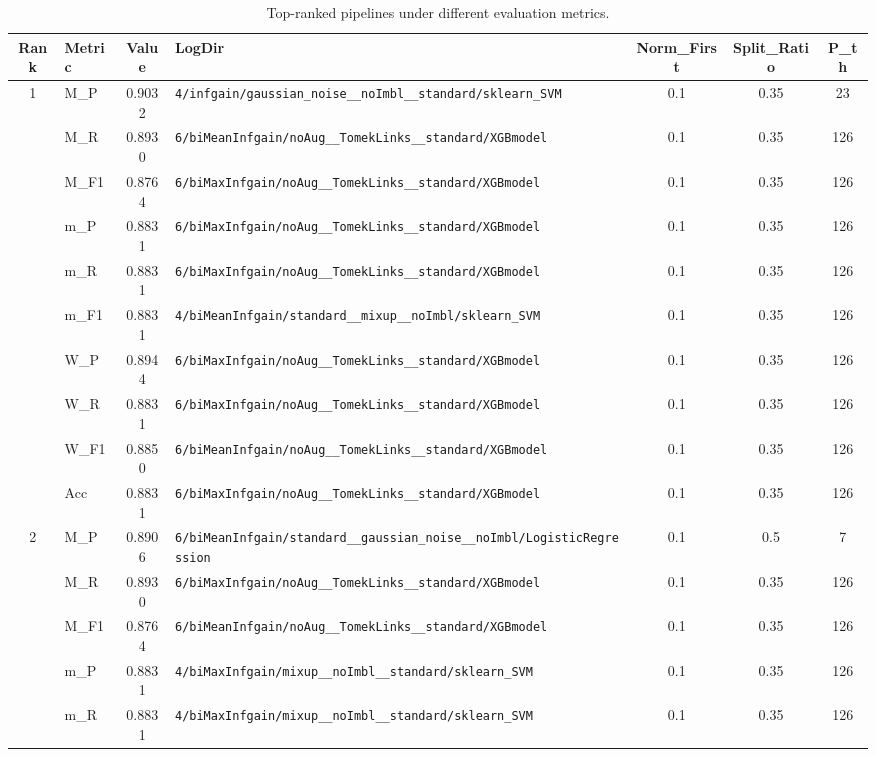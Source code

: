 \begin{table}[htbp]
\caption{Top-ranked pipelines under different evaluation metrics.}
\label{tab:rank_metric_vertical}
\centering
\small
\setlength{\tabcolsep}{4pt}
\begin{tabular}{|c|l|c|>{\ttfamily\footnotesize}p{7.2cm}|c|c|c|}
\hline
Rank & Metric & Value & LogDir & Norm\_First & Split\_Ratio & P\_th \\
\hline
\multirow{10}{*}{1} & M\_P & 0.9032 & \texttt{4/infgain/gaussian\_noise\_\_noImbl\_\_standard/sklearn\_SVM} & 0.1 & 0.35  & 23 \\ 
 & M\_R & 0.8930 & \texttt{6/biMeanInfgain/noAug\_\_TomekLinks\_\_standard/XGBmodel} & 0.1 & 0.35  & 126 \\ 
 & M\_F1 & 0.8764 & \texttt{6/biMaxInfgain/noAug\_\_TomekLinks\_\_standard/XGBmodel} & 0.1 & 0.35  & 126 \\ 
 & m\_P & 0.8831 & \texttt{6/biMaxInfgain/noAug\_\_TomekLinks\_\_standard/XGBmodel} & 0.1 & 0.35  & 126 \\ 
 & m\_R & 0.8831 & \texttt{6/biMaxInfgain/noAug\_\_TomekLinks\_\_standard/XGBmodel} & 0.1 & 0.35  & 126 \\ 
 & m\_F1 & 0.8831 & \texttt{4/biMeanInfgain/standard\_\_mixup\_\_noImbl/sklearn\_SVM} & 0.1 & 0.35  & 126 \\ 
 & W\_P & 0.8944 & \texttt{6/biMaxInfgain/noAug\_\_TomekLinks\_\_standard/XGBmodel} & 0.1 & 0.35  & 126 \\ 
 & W\_R & 0.8831 & \texttt{6/biMaxInfgain/noAug\_\_TomekLinks\_\_standard/XGBmodel} & 0.1 & 0.35  & 126 \\ 
 & W\_F1 & 0.8850 & \texttt{6/biMeanInfgain/noAug\_\_TomekLinks\_\_standard/XGBmodel} & 0.1 & 0.35  & 126 \\ 
 & Acc & 0.8831 & \texttt{6/biMaxInfgain/noAug\_\_TomekLinks\_\_standard/XGBmodel} & 0.1 & 0.35  & 126 \\ 
\hline
\multirow{10}{*}{2} & M\_P & 0.8906 & \texttt{6/biMeanInfgain/standard\_\_gaussian\_noise\_\_noImbl/LogisticRegression} & 0.1 & 0.5  & 7 \\ 
 & M\_R & 0.8930 & \texttt{6/biMaxInfgain/noAug\_\_TomekLinks\_\_standard/XGBmodel} & 0.1 & 0.35  & 126 \\ 
 & M\_F1 & 0.8764 & \texttt{6/biMeanInfgain/noAug\_\_TomekLinks\_\_standard/XGBmodel} & 0.1 & 0.35  & 126 \\ 
 & m\_P & 0.8831 & \texttt{4/biMaxInfgain/mixup\_\_noImbl\_\_standard/sklearn\_SVM} & 0.1 & 0.35  & 126 \\ 
 & m\_R & 0.8831 & \texttt{4/biMaxInfgain/mixup\_\_noImbl\_\_standard/sklearn\_SVM} & 0.1 & 0.35  & 126 \\ 

\end{tabular}
\end{table}

